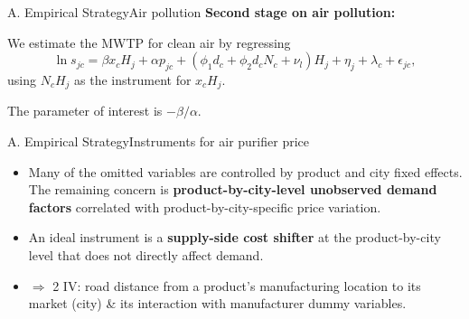 \documentclass{beamer}
\begin{document}
\begin{frame}{A. Empirical Strategy}{Air pollution}
	\textbf{Second stage on air pollution:}
	
	We estimate the MWTP for clean air by regressing
	\begin{equation}
		\ln s_{jc}=\beta x_cH_j+\alpha p_{jc}+(\phi_1d_c+\phi_2d_cN_c+\nu_l)H_j+\eta_j+\lambda_c+\epsilon_{jc},
	\end{equation}
	using $N_cH_j$ as the instrument for $x_cH_j$.
	
	The parameter of interest is $-\beta/\alpha$.
\end{frame}
\begin{frame}{A. Empirical Strategy}{Instruments for air purifier price}
	\begin{itemize}
		\item Many of the omitted variables are controlled by product and city fixed effects. The remaining concern is \textbf{product-by-city-level unobserved demand factors} correlated with product-by-city-specific price variation.
		\item An ideal instrument is a \textbf{supply-side cost shifter} at the product-by-city level that does not directly affect demand.
		\item $\Rightarrow$ 2 IV: road distance from a product’s manufacturing location to its market (city) \& its interaction with manufacturer dummy variables.
	\end{itemize}
\end{frame}
\end{document}
